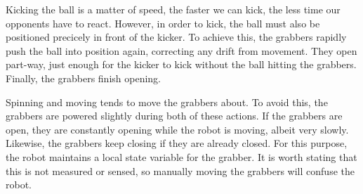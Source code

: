 Kicking the ball is a matter of speed, the faster we can kick, the less time
our opponents have to react. However, in order to kick, the ball must also be
positioned precicely in front of the kicker. To achieve this, the grabbers
rapidly push the ball into position again, correcting any drift from movement.
They open part-way, just enough for the kicker to kick without the ball
hitting the grabbers. Finally, the grabbers finish opening.

Spinning and moving tends to move the grabbers about. To avoid this, the
grabbers are powered slightly during both of these actions. If the grabbers are
open, they are constantly opening while the robot is moving, albeit very
slowly. Likewise, the grabbers keep closing if they are already closed. For
this purpose, the robot maintains a local state variable for the grabber. It is
worth stating that this is not measured or sensed, so manually moving the
grabbers will confuse the robot.
